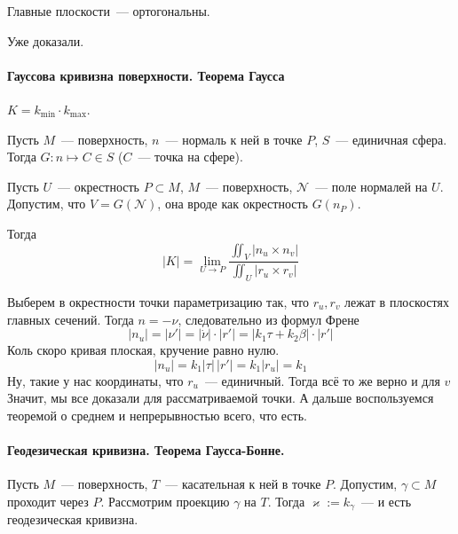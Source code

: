 \documentclass[draft,timbord]{longnotes}
\begin{document}
\begin{thrm}\label{thrm:meas::curfctr::minmaxplanes}
  Главные плоскости~--- ортогональны.
\end{thrm}
Уже доказали.
\paragraph{Гауссова кривизна поверхности. Теорема Гаусса}
\label{par:meas::gauss}

\begin{defn}\label{defn:meas::gauss::crvf}
  $K = k_{\min} \cdot k_{\max}$.
\end{defn}

\begin{defn}\label{defn:meas::gauss::map}
  Пусть $M$~--- поверхность, $n$~--- нормаль к ней в точке $P$, $S$~--- единичная сфера.
  Тогда $G: n \mapsto C \in S$ ($C$~--- точка на сфере).
\end{defn}

\begin{thrm}\label{thrm:meas::gauss::lim}
  Пусть $U$~--- окрестность $P \subset M$, $M$~--- поверхность, $\mathcal N$~--- поле нормалей
  на $U$. Допустим, что $V = G(\mathcal N)$, она вроде как окрестность $G(n_P)$. 

  Тогда \[
    |K| = \lim_{U \to P} \frac{\iint_V |n_u \times n_v|}{\iint_U|r_u \times r_v|} 
  \]
\end{thrm}

\begin{tproof}
  Выберем в окрестности точки параметризацию так, что $r_u, r_v$ лежат в плоскостях главных сечений.
  Тогда $n = -\nu$, следовательно из формул Френе \[
    |n_u| = |\nu'| = |\dot \nu|\cdot |r'| = |k_1 \tau + k_2 \beta| \cdot |r'|
  \]
  Коль скоро кривая плоская, кручение равно нулю.
  \[
    |n_u| = k_1 |\tau| \, |r'| = k_1 |r_u| = k_1
  \]
  Ну, такие у нас координаты, что  $r_u$~--- единичный. Тогда всё то же верно и для $v$
  Значит, мы все доказали для рассматриваемой точки. А дальше воспользуемся теоремой
  о среднем и непрерывностью всего, что есть.
\end{tproof}

\paragraph{Геодезическая кривизна. Теорема Гаусса-Бонне.}
\label{par:dg::bonnet}

\begin{defn}\label{defn:dg::bonnet::geodcrvn}
  Пусть $M$~--- поверхность, $T$~--- касательная к ней в точке $P$. Допустим,
  $\gamma \subset M$ проходит через $P$. Рассмотрим проекцию $\gamma$ на $T$.
  Тогда $\varkappa := k_\gamma $~--- и есть геодезическая кривизна.
\end{defn}
\end{document}
